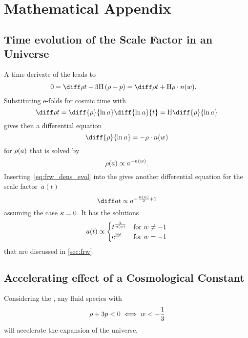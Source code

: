 \cleardoublepage
\chapter{Mathematical Appendix}

\section{Time evolution of the Scale Factor in an \FLRW{} Universe}\label{app:deriv_frw_a_evol}

A time derivate of the  leads to
\begin{align}
	0 &= \dt{\dens} + 3\Hcosm\del{\dens + p} = \dt{\dens} + \Hcosm\dens \cdot \nexp
	\eqpunct{.}
\end{align}
Substituting e-folds for cosmic time with
\begin{equation}
	\dt{\dens} = \diff{\dens}{\efold} \diff{\efold}{t} = \Hcosm \diff{\dens}{\efold}
\end{equation}
gives then a differential equation
\begin{equation}
	\diff{\dens}{\efold} = -\dens \cdot \nexp
\end{equation}
for \(\rho(a)\) that is solved by
\begin{equation}
	\rho(a) \propto a^{-n(w)}
	\mathpunct{.}
\end{equation}
Inserting~\eqref{eq:frw_dens_evol} into the  gives another differential equation for the scale factor~\(a(t)\)
\begin{equation}
	\dt{a} \propto a^{-\frac{\nexp}{2}+1}
\end{equation}
assuming the case \(\kappa=0\). It has the solutions
\begin{equation}
	a(t) \propto
	\begin{cases}
		t^{\frac{2}{n(w)}} &\text{for \(w\neq-1\)} \\
		\mathrm{e}^{\mathrm{H} t} &\text{for \(w=-1\)}
	\end{cases}
\end{equation}
that are discussed in \autoref{sec:frw}.


\section{Accelerating effect of a Cosmological Constant}\label{app:deriv_acc_exp_lambda}

Considering the , any fluid species with
\begin{equation}\label{eq:acc_cond}
	\rho + 3 p < 0 \iff w < -\frac{1}{3}
\end{equation}
will accelerate the expansion of the universe.


